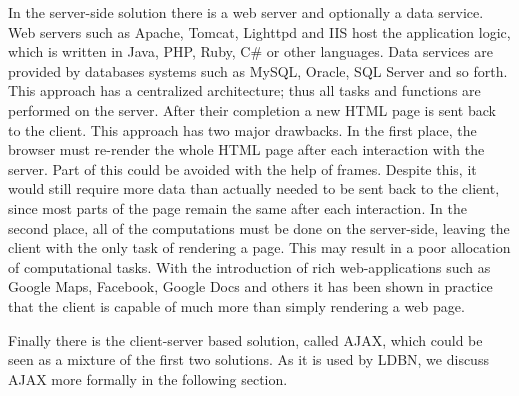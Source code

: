 In the server-side solution there is a web server and optionally a data service. 
Web servers such as Apache, Tomcat, Lighttpd and IIS host the application 
logic, which is written in Java, PHP, Ruby, C\# or other languages. 
Data services are provided by databases systems such as MySQL, Oracle, SQL Server and 
so forth. This approach has a centralized architecture; thus all tasks and 
functions are performed on the server. After their completion a new HTML page is 
sent back to the client. This approach has two major drawbacks. In the first place, 
the browser must re-render the whole HTML page after each interaction with the server.
Part of this could be avoided with the help of frames. Despite this, it would still 
require more data than actually needed to be sent back to the client, since most 
parts of the page remain the same after each interaction. In the second place, 
all of the computations must be done on the server-side, leaving the client with 
the only task of rendering a page. This may result in a poor allocation of computational tasks. 
With the introduction of rich web-applications such as Google Maps, Facebook, 
Google Docs and others it has been shown in practice that the client is capable of 
much more than simply rendering a web page. 

Finally there is the client-server based solution, called AJAX, which could be
seen as a mixture 
of the first two solutions. As it is used by LDBN, we
discuss AJAX more formally in the following section.

